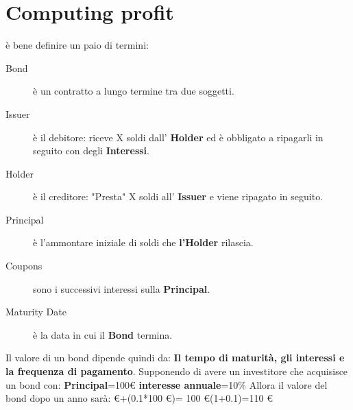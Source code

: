 \documentclass[a4paper,11pt]{report}
\begin{document}
{%
\section{Computing profit}
è bene definire un paio di termini:
\begin {description}
\item[Bond] è un contratto a lungo termine tra due soggetti.
\item[Issuer] è il debitore: riceve X soldi dall' {\bfseries Holder} ed è obbligato a ripagarli in seguito con degli {\bfseries Interessi}.
\item[Holder] è il creditore: "Presta" X soldi all' {\bfseries Issuer} e viene ripagato in seguito.
\item[Principal] è l'ammontare iniziale di soldi che {\bfseries l'Holder} rilascia.
\item[Coupons] sono i successivi interessi sulla {\bfseries Principal}.
\item[Maturity Date] è la data in cui il {\bfseries Bond} termina.
\end {description}
Il valore di un bond dipende quindi da:  {\bfseries Il tempo di maturità, gli interessi e la frequenza di pagamento}. \newline
Supponendo di avere un investitore che acquisisce un bond con: \newline
\textbf{Principal}=100\euro \newline
\textbf{interesse annuale}=10\% \newline
Allora il valore del bond dopo un anno sarà: \euro+(0.1*100 \euro)= 100 \euro *(1+0.1)=110 \euro
\newpage

}
\end{document}
